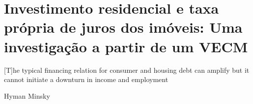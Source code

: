 \chapter{Investimento residencial e taxa própria de juros dos imóveis: Uma investigação a partir de um VECM}
\label{CapFatos}

\epigraph{[T]he typical
financing relation for consumer and housing debt can amplify but it cannot initiate a
downturn in income and employment}{Hyman Minsky}







